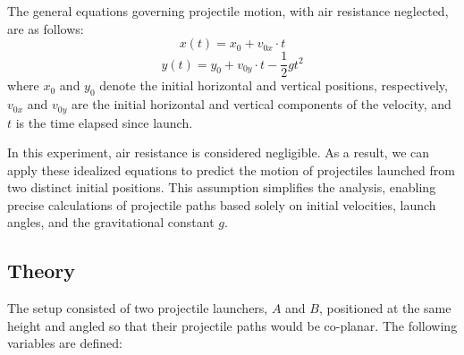 \documentclass[12pt]{article}
\begin{document}
The general equations governing projectile motion, with air resistance neglected, are as follows:
\[
x(t) = x_0 + v_{0x} \cdot t
\]
\[
y(t) = y_0 + v_{0y} \cdot t - \frac{1}{2} g t^2
\]
where \( x_0 \) and \( y_0 \) denote the initial horizontal and vertical positions, respectively, \( v_{0x} \) and \( v_{0y} \) are the initial horizontal and vertical components of the velocity, and \( t \) is the time elapsed since launch.

In this experiment, air resistance is considered negligible. As a result, we can apply these idealized equations to predict the motion of projectiles launched from two distinct initial positions. This assumption simplifies the analysis, enabling precise calculations of projectile paths based solely on initial velocities, launch angles, and the gravitational constant \( g \).

\subsection{Theory}

The setup consisted of two projectile launchers, \(A\) and \(B\), positioned at the same height and angled so that their projectile paths would be co-planar. The following variables are defined:
\end{document}
